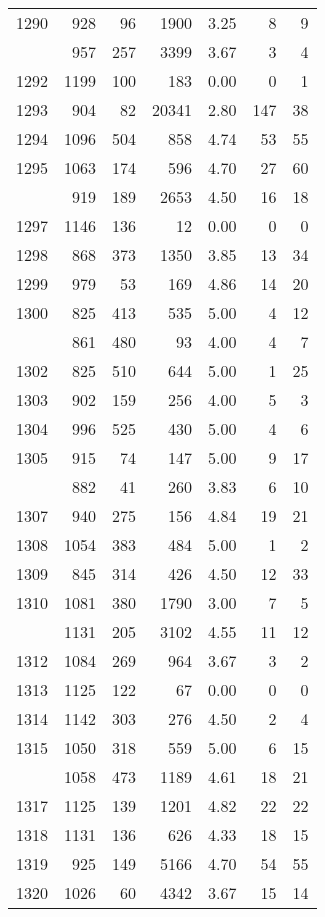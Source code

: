 \documentclass[
]{article}
\begin{document}
\begin{table}
\begin{tabular}[t]{lrrrrrr}
1290 & 928 & 96 & 1900 & 3.25 & 8 & 9\\
\addlinespace
1291 & 957 & 257 & 3399 & 3.67 & 3 & 4\\
1292 & 1199 & 100 & 183 & 0.00 & 0 & 1\\
1293 & 904 & 82 & 20341 & 2.80 & 147 & 38\\
1294 & 1096 & 504 & 858 & 4.74 & 53 & 55\\
1295 & 1063 & 174 & 596 & 4.70 & 27 & 60\\
\addlinespace
1296 & 919 & 189 & 2653 & 4.50 & 16 & 18\\
1297 & 1146 & 136 & 12 & 0.00 & 0 & 0\\
1298 & 868 & 373 & 1350 & 3.85 & 13 & 34\\
1299 & 979 & 53 & 169 & 4.86 & 14 & 20\\
1300 & 825 & 413 & 535 & 5.00 & 4 & 12\\
\addlinespace
1301 & 861 & 480 & 93 & 4.00 & 4 & 7\\
1302 & 825 & 510 & 644 & 5.00 & 1 & 25\\
1303 & 902 & 159 & 256 & 4.00 & 5 & 3\\
1304 & 996 & 525 & 430 & 5.00 & 4 & 6\\
1305 & 915 & 74 & 147 & 5.00 & 9 & 17\\
\addlinespace
1306 & 882 & 41 & 260 & 3.83 & 6 & 10\\
1307 & 940 & 275 & 156 & 4.84 & 19 & 21\\
1308 & 1054 & 383 & 484 & 5.00 & 1 & 2\\
1309 & 845 & 314 & 426 & 4.50 & 12 & 33\\
1310 & 1081 & 380 & 1790 & 3.00 & 7 & 5\\
\addlinespace
1311 & 1131 & 205 & 3102 & 4.55 & 11 & 12\\
1312 & 1084 & 269 & 964 & 3.67 & 3 & 2\\
1313 & 1125 & 122 & 67 & 0.00 & 0 & 0\\
1314 & 1142 & 303 & 276 & 4.50 & 2 & 4\\
1315 & 1050 & 318 & 559 & 5.00 & 6 & 15\\
\addlinespace
1316 & 1058 & 473 & 1189 & 4.61 & 18 & 21\\
1317 & 1125 & 139 & 1201 & 4.82 & 22 & 22\\
1318 & 1131 & 136 & 626 & 4.33 & 18 & 15\\
1319 & 925 & 149 & 5166 & 4.70 & 54 & 55\\
1320 & 1026 & 60 & 4342 & 3.67 & 15 & 14\\

\end{tabular}
\end{table}
\end{document}
